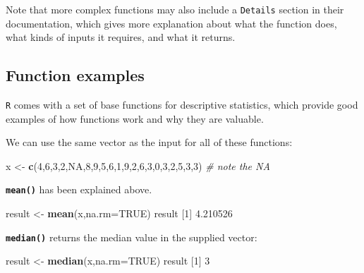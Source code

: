 \documentclass[
]{book}
\newenvironment{Shaded}{\begin{snugshade}}{\end{snugshade}}
\newcommand{\CommentTok}[1]{\textcolor[rgb]{0.56,0.35,0.01}{\textit{#1}}}
\newcommand{\DataTypeTok}[1]{\textcolor[rgb]{0.13,0.29,0.53}{#1}}
\newcommand{\DecValTok}[1]{\textcolor[rgb]{0.00,0.00,0.81}{#1}}
\newcommand{\FloatTok}[1]{\textcolor[rgb]{0.00,0.00,0.81}{#1}}
\newcommand{\KeywordTok}[1]{\textcolor[rgb]{0.13,0.29,0.53}{\textbf{#1}}}
\newcommand{\NormalTok}[1]{#1}
\newcommand{\OtherTok}[1]{\textcolor[rgb]{0.56,0.35,0.01}{#1}}
\newcommand{\StringTok}[1]{\textcolor[rgb]{0.31,0.60,0.02}{#1}}
\begin{document}
Note that more complex functions may also include a \texttt{Details} section in their documentation, which gives more explanation about what the function does, what kinds of inputs it requires, and what it returns.

\hypertarget{function-examples}{%
\subsection*{Function examples}\label{function-examples}}

\texttt{R} comes with a set of base functions for descriptive statistics, which provide good examples of how functions work and why they are valuable.

We can use the same vector as the input for all of these functions:

\begin{Shaded}
\begin{Highlighting}[]
\NormalTok{x <-}\StringTok{ }\KeywordTok{c}\NormalTok{(}\DecValTok{4}\NormalTok{,}\DecValTok{6}\NormalTok{,}\DecValTok{3}\NormalTok{,}\DecValTok{2}\NormalTok{,}\OtherTok{NA}\NormalTok{,}\DecValTok{8}\NormalTok{,}\DecValTok{9}\NormalTok{,}\DecValTok{5}\NormalTok{,}\DecValTok{6}\NormalTok{,}\DecValTok{1}\NormalTok{,}\DecValTok{9}\NormalTok{,}\DecValTok{2}\NormalTok{,}\DecValTok{6}\NormalTok{,}\DecValTok{3}\NormalTok{,}\DecValTok{0}\NormalTok{,}\DecValTok{3}\NormalTok{,}\DecValTok{2}\NormalTok{,}\DecValTok{5}\NormalTok{,}\DecValTok{3}\NormalTok{,}\DecValTok{3}\NormalTok{)  }\CommentTok{# note the NA}
\end{Highlighting}
\end{Shaded}

\textbf{\texttt{mean()}} has been explained above.

\begin{Shaded}
\begin{Highlighting}[]
\NormalTok{result <-}\StringTok{ }\KeywordTok{mean}\NormalTok{(x,}\DataTypeTok{na.rm=}\OtherTok{TRUE}\NormalTok{)}
\NormalTok{result}
\NormalTok{[}\DecValTok{1}\NormalTok{] }\FloatTok{4.210526}
\end{Highlighting}
\end{Shaded}

\textbf{\texttt{median()}} returns the median value in the supplied vector:

\begin{Shaded}
\begin{Highlighting}[]
\NormalTok{result <-}\StringTok{ }\KeywordTok{median}\NormalTok{(x,}\DataTypeTok{na.rm=}\OtherTok{TRUE}\NormalTok{)}
\NormalTok{result}
\NormalTok{[}\DecValTok{1}\NormalTok{] }\DecValTok{3}
\end{Highlighting}
\end{Shaded}
\end{document}
